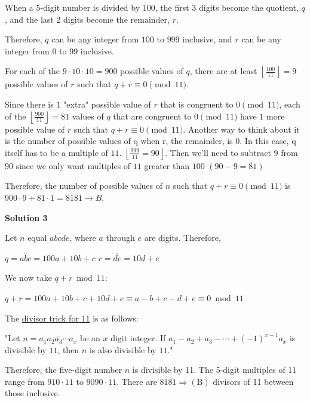 \begin{enumerate}
When a $5$-digit number is divided by $100$, the first $3$ digits become the quotient, $q$, and the last $2$ digits become the remainder, $r$. 

 Therefore, $q$ can be any integer from $100$ to $999$ inclusive, and $r$ can be any integer from $0$ to $99$ inclusive. 

 For each of the $9\cdot10\cdot10=900$ possible values of $q$, there are at least $\left\lfloor \frac{100}{11} \right\rfloor = 9$ possible values of $r$ such that $q+r \equiv 0\pmod{11}$. 

 Since there is $1$ "extra" possible value of $r$ that is congruent to $0\pmod{11}$, each of the $\left\lfloor \frac{900}{11} \right\rfloor = 81$ values of $q$ that are congruent to $0\pmod{11}$ have $1$ more possible value of $r$ such that $q+r \equiv 0\pmod{11}$. Another way to think about it is the number of possible values of q when r, the remainder, is $0$. In this case, q itself has to be a multiple of $11$. $\left\lfloor \frac{999}{11} = 90 \right\rfloor$. Then we'll need to subtract $9$ from $90$ since we only want multiples of $11$ greater than $100$ $(90-9=81)$

 Therefore, the number of possible values of $n$ such that $q+r \equiv 0\pmod{11}$ is $900\cdot9+81\cdot1=8181 \rightarrow B$.

 



\textbf{Solution 3}

Let $n$ equal $\overline{abcde}$, where $a$ through $e$ are digits. Therefore,

 $q=\overline{abc}=100a+10b+c$
$r=\overline{de}=10d+e$

 We now take $q+r\bmod{11}$:

 $q+r=100a+10b+c+10d+e\equiv a-b+c-d+e\equiv 0\bmod{11}$

 The \href{https://artofproblemsolving.com/wiki/index.php?title=Divisibility\_rules\#Divisibility\_Rule\_for\_Divisibility\_rules\#Divisibility\_Rule\_for\_11}{divisor trick for 11} is as follows:

 "Let $n=\overline{a_1a_2a_3\cdots a_x}$ be an $x$ digit integer. If $a_1-a_2+a_3-\cdots +(-1)^{x-1} a_x$ is divisible by $11$, then $n$ is also divisible by $11$."

 Therefore, the five-digit number $n$ is divisible by 11. The 5-digit multiples of 11 range from $910\cdot 11$ to $9090\cdot 11$. There are $8181\Rightarrow \mathrm{(B)}$ divisors of 11 between those inclusive.

 




\end{enumerate}
